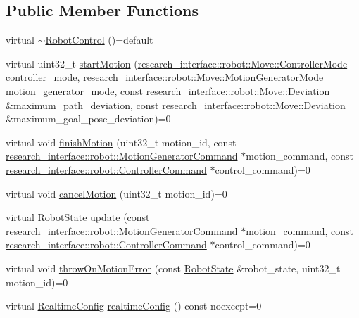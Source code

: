 \subsection*{Public Member Functions}
\begin{DoxyCompactItemize}
\item 
virtual \hyperlink{classfranka_1_1RobotControl_a4a79e68d1a4cb81377b08ed3d377f5f7}{$\sim$\+Robot\+Control} ()=default
\item 
virtual uint32\+\_\+t \hyperlink{classfranka_1_1RobotControl_a4a91a5baea3f7edc7eb094ef8208c065}{start\+Motion} (\hyperlink{structresearch__interface_1_1robot_1_1Move_a3e7b80b30bbf01dc902c84402502ebbc}{research\+\_\+interface\+::robot\+::\+Move\+::\+Controller\+Mode} controller\+\_\+mode, \hyperlink{structresearch__interface_1_1robot_1_1Move_a334b8380507154e8042b57fbd3287c0f}{research\+\_\+interface\+::robot\+::\+Move\+::\+Motion\+Generator\+Mode} motion\+\_\+generator\+\_\+mode, const \hyperlink{structresearch__interface_1_1robot_1_1Move_1_1Deviation}{research\+\_\+interface\+::robot\+::\+Move\+::\+Deviation} \&maximum\+\_\+path\+\_\+deviation, const \hyperlink{structresearch__interface_1_1robot_1_1Move_1_1Deviation}{research\+\_\+interface\+::robot\+::\+Move\+::\+Deviation} \&maximum\+\_\+goal\+\_\+pose\+\_\+deviation)=0
\item 
virtual void \hyperlink{classfranka_1_1RobotControl_aae1629178b5eeb5d8e4d41d2f746f2fc}{finish\+Motion} (uint32\+\_\+t motion\+\_\+id, const \hyperlink{structresearch__interface_1_1robot_1_1MotionGeneratorCommand}{research\+\_\+interface\+::robot\+::\+Motion\+Generator\+Command} $\ast$motion\+\_\+command, const \hyperlink{structresearch__interface_1_1robot_1_1ControllerCommand}{research\+\_\+interface\+::robot\+::\+Controller\+Command} $\ast$control\+\_\+command)=0
\item 
virtual void \hyperlink{classfranka_1_1RobotControl_a8eb19b5e21e2ac8d9c98bffe2dd9124d}{cancel\+Motion} (uint32\+\_\+t motion\+\_\+id)=0
\item 
virtual \hyperlink{structfranka_1_1RobotState}{Robot\+State} \hyperlink{classfranka_1_1RobotControl_a5b581e84547a76ad1600158345cfd40d}{update} (const \hyperlink{structresearch__interface_1_1robot_1_1MotionGeneratorCommand}{research\+\_\+interface\+::robot\+::\+Motion\+Generator\+Command} $\ast$motion\+\_\+command, const \hyperlink{structresearch__interface_1_1robot_1_1ControllerCommand}{research\+\_\+interface\+::robot\+::\+Controller\+Command} $\ast$control\+\_\+command)=0
\item 
virtual void \hyperlink{classfranka_1_1RobotControl_a796e9fb049ffc36ea44bec85f24e2fe4}{throw\+On\+Motion\+Error} (const \hyperlink{structfranka_1_1RobotState}{Robot\+State} \&robot\+\_\+state, uint32\+\_\+t motion\+\_\+id)=0
\item 
virtual \hyperlink{namespacefranka_aeede4f4629390fea21ca5e5a35a8a943}{Realtime\+Config} \hyperlink{classfranka_1_1RobotControl_aca02c0c27b863d4a42e08d541c400832}{realtime\+Config} () const noexcept=0
\end{DoxyCompactItemize}



